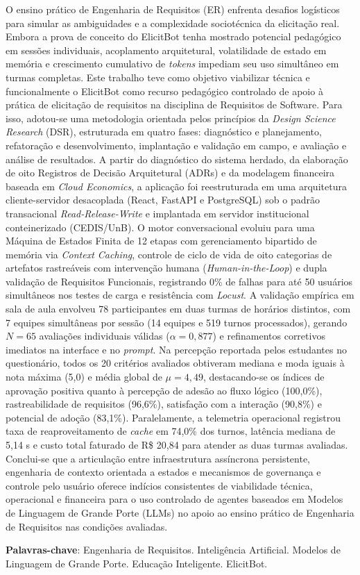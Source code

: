 \begin{resumo}

O ensino prático de Engenharia de Requisitos (ER) enfrenta desafios logísticos para simular as ambiguidades e a complexidade sociotécnica da elicitação real. Embora a prova de conceito do ElicitBot tenha mostrado potencial pedagógico em sessões individuais, acoplamento arquitetural, volatilidade de estado em memória e crescimento cumulativo de \textit{tokens} impediam seu uso simultâneo em turmas completas. Este trabalho teve como objetivo viabilizar técnica e funcionalmente o ElicitBot como recurso pedagógico controlado de apoio à prática de elicitação de requisitos na disciplina de Requisitos de Software. Para isso, adotou-se uma metodologia orientada pelos princípios da \textit{Design Science Research} (DSR), estruturada em quatro fases: diagnóstico e planejamento, refatoração e desenvolvimento, implantação e validação em campo, e avaliação e análise de resultados. A partir do diagnóstico do sistema herdado, da elaboração de oito Registros de Decisão Arquitetural (ADRs) e da modelagem financeira baseada em \textit{Cloud Economics}, a aplicação foi reestruturada em uma arquitetura cliente-servidor desacoplada (React, FastAPI e PostgreSQL) sob o padrão transacional \textit{Read-Release-Write} e implantada em servidor institucional conteinerizado (CEDIS/UnB). O motor conversacional evoluiu para uma Máquina de Estados Finita de 12 etapas com gerenciamento bipartido de memória via \textit{Context Caching}, controle de ciclo de vida de oito categorias de artefatos rastreáveis com intervenção humana (\textit{Human-in-the-Loop}) e dupla validação de Requisitos Funcionais, registrando 0\% de falhas para até 50 usuários simultâneos nos testes de carga e resistência com \textit{Locust}. A validação empírica em sala de aula envolveu 78 participantes em duas turmas de horários distintos, com 7 equipes simultâneas por sessão (14 equipes e 519 turnos processados), gerando $N = 65$ avaliações individuais válidas ($\alpha = 0,877$) e refinamentos corretivos imediatos na interface e no \textit{prompt}. Na percepção reportada pelos estudantes no questionário, todos os 20 critérios avaliados obtiveram mediana e moda iguais à nota máxima (5,0) e média global de $\mu = 4,49$, destacando-se os índices de aprovação positiva quanto à percepção de adesão ao fluxo lógico (100,0\%), rastreabilidade de requisitos (96,6\%), satisfação com a interação (90,8\%) e potencial de adoção (83,1\%). Paralelamente, a telemetria operacional registrou taxa de reaproveitamento de \textit{cache} em 74,0\% dos turnos, latência mediana de 5,14 s e custo total faturado de R\$ 20,84 para atender as duas turmas avaliadas. Conclui-se que a articulação entre infraestrutura assíncrona persistente, engenharia de contexto orientada a estados e mecanismos de governança e controle pelo usuário oferece indícios consistentes de viabilidade técnica, operacional e financeira para o uso controlado de agentes baseados em Modelos de Linguagem de Grande Porte (LLMs) no apoio ao ensino prático de Engenharia de Requisitos nas condições avaliadas.

\vspace{\onelineskip}
    
\noindent
\textbf{Palavras-chave}: Engenharia de Requisitos. Inteligência Artificial. Modelos de Linguagem de Grande Porte. Educação Inteligente. ElicitBot.
\end{resumo}
